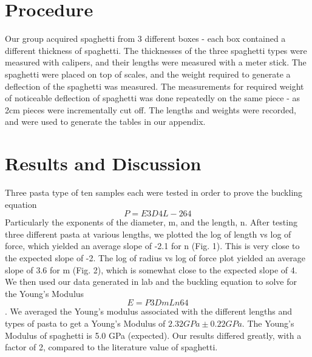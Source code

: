 \documentclass[12pt]{article}
\begin{document}
\section{Procedure}

Our group acquired spaghetti from 3 different boxes - each box contained a different thickness of spaghetti. The thicknesses of the three spaghetti types were measured with calipers, and their lengths were measured with a meter stick. The spaghetti were placed on top of scales, and the weight required to generate a deflection of the spaghetti was measured. The measurements for required weight of noticeable deflection of spaghetti was done repeatedly on the same piece - as 2cm pieces were incrementally cut off. The lengths and weights were recorded, and were used to generate the tables in our appendix.

\section{Results and Discussion}

Three pasta type of ten samples each were tested in order to prove the buckling equation
$$P=E3D4L-264$$
Particularly the exponents of the diameter, m, and the length, n. After testing three different pasta at various lengths, we plotted the log of length vs log of force, which yielded an average slope of -2.1 for n (Fig. 1). This is very close to the expected slope of -2. The log of radius vs log of force plot yielded an average slope of 3.6 for m (Fig. 2), which is somewhat close to the expected slope of 4. We then used our data generated in lab and the buckling equation to solve for the Young's Modulus $$E=P3DmLn64$$. We averaged the Young's modulus associated with the different lengths and types of pasta to get a Young's Modulus of $2.32 GPa \pm 0.22 GPa$. The Young's Modulus of spaghetti is 5.0 GPa (expected). Our results differed greatly, with a factor of 2, compared to the literature value of spaghetti.
\end{document}
